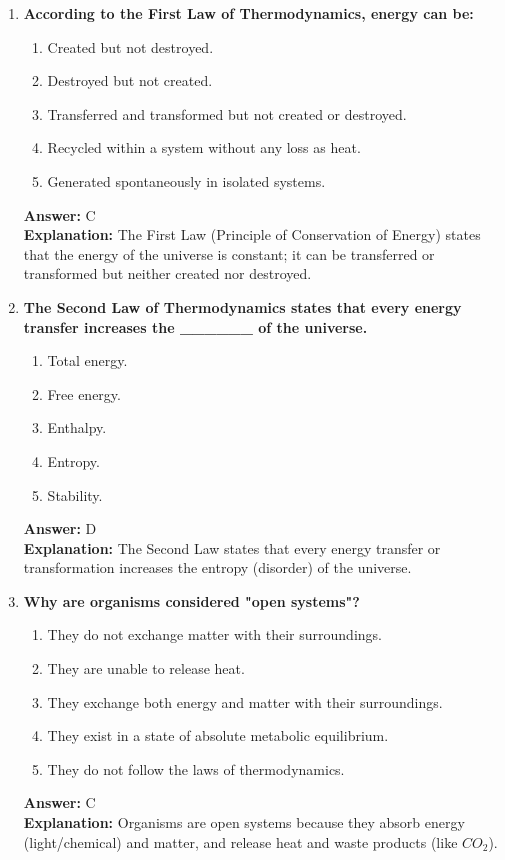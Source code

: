 \documentclass[11pt, a4paper]{article}
\begin{document}
\begin{enumerate}[leftmargin=*, label=\arabic*.]
\item \textbf{According to the First Law of Thermodynamics, energy can be:}
\begin{enumerate}[label=\Alph*.]
    \item Created but not destroyed.
    \item Destroyed but not created.
    \item Transferred and transformed but not created or destroyed.
    \item Recycled within a system without any loss as heat.
    \item Generated spontaneously in isolated systems.
\end{enumerate}
\textbf{Answer:} C \\
\textbf{Explanation:} The First Law (Principle of Conservation of Energy) states that the energy of the universe is constant; it can be transferred or transformed but neither created nor destroyed.

\item \textbf{The Second Law of Thermodynamics states that every energy transfer increases the \_\_\_\_\_\_ of the universe.}
\begin{enumerate}[label=\Alph*.]
    \item Total energy.
    \item Free energy.
    \item Enthalpy.
    \item Entropy.
    \item Stability.
\end{enumerate}
\textbf{Answer:} D \\
\textbf{Explanation:} The Second Law states that every energy transfer or transformation increases the entropy (disorder) of the universe.

\item \textbf{Why are organisms considered "open systems"?}
\begin{enumerate}[label=\Alph*.]
    \item They do not exchange matter with their surroundings.
    \item They are unable to release heat.
    \item They exchange both energy and matter with their surroundings.
    \item They exist in a state of absolute metabolic equilibrium.
    \item They do not follow the laws of thermodynamics.
\end{enumerate}
\textbf{Answer:} C \\
\textbf{Explanation:} Organisms are open systems because they absorb energy (light/chemical) and matter, and release heat and waste products (like $CO_2$).


\end{enumerate}
\end{document}
